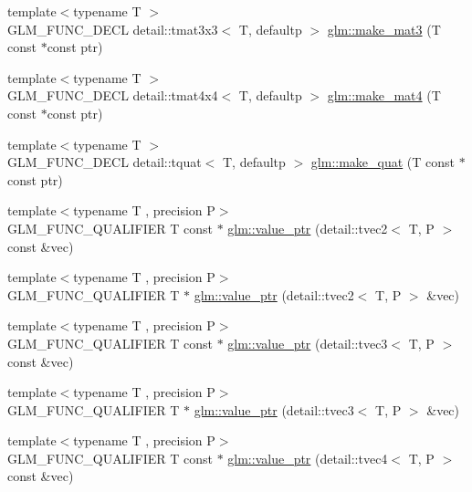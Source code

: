 \begin{DoxyCompactItemize}
\item 
{\footnotesize template$<$typename T $>$ }\\G\+L\+M\+\_\+\+F\+U\+N\+C\+\_\+\+D\+E\+CL detail\+::tmat3x3$<$ T, defaultp $>$ \hyperlink{group__gtc__type__ptr_gae50ecac46eb8771fb074e310b602bf53}{glm\+::make\+\_\+mat3} (T const $\ast$const ptr)
\item 
{\footnotesize template$<$typename T $>$ }\\G\+L\+M\+\_\+\+F\+U\+N\+C\+\_\+\+D\+E\+CL detail\+::tmat4x4$<$ T, defaultp $>$ \hyperlink{group__gtc__type__ptr_gac3920fd61f0c459a4749b8eb9107982c}{glm\+::make\+\_\+mat4} (T const $\ast$const ptr)
\item 
{\footnotesize template$<$typename T $>$ }\\G\+L\+M\+\_\+\+F\+U\+N\+C\+\_\+\+D\+E\+CL detail\+::tquat$<$ T, defaultp $>$ \hyperlink{group__gtc__type__ptr_ga051ec24a44af31a08b11eccbf8726b02}{glm\+::make\+\_\+quat} (T const $\ast$const ptr)
\item 
{\footnotesize template$<$typename T , precision P$>$ }\\G\+L\+M\+\_\+\+F\+U\+N\+C\+\_\+\+Q\+U\+A\+L\+I\+F\+I\+ER T const $\ast$ \hyperlink{group__gtc__type__ptr_gac57a976f59e794e6406ecf2924a18f4e}{glm\+::value\+\_\+ptr} (detail\+::tvec2$<$ T, P $>$ const \&vec)
\item 
{\footnotesize template$<$typename T , precision P$>$ }\\G\+L\+M\+\_\+\+F\+U\+N\+C\+\_\+\+Q\+U\+A\+L\+I\+F\+I\+ER T $\ast$ \hyperlink{group__gtc__type__ptr_gac2a64387090621acf7176b63f31b70a2}{glm\+::value\+\_\+ptr} (detail\+::tvec2$<$ T, P $>$ \&vec)
\item 
{\footnotesize template$<$typename T , precision P$>$ }\\G\+L\+M\+\_\+\+F\+U\+N\+C\+\_\+\+Q\+U\+A\+L\+I\+F\+I\+ER T const $\ast$ \hyperlink{group__gtc__type__ptr_ga676a0ba6f4b7cd817fe6d16cb3113857}{glm\+::value\+\_\+ptr} (detail\+::tvec3$<$ T, P $>$ const \&vec)
\item 
{\footnotesize template$<$typename T , precision P$>$ }\\G\+L\+M\+\_\+\+F\+U\+N\+C\+\_\+\+Q\+U\+A\+L\+I\+F\+I\+ER T $\ast$ \hyperlink{group__gtc__type__ptr_ga4babc9956e32bbd0769bc20ab2d73800}{glm\+::value\+\_\+ptr} (detail\+::tvec3$<$ T, P $>$ \&vec)
\item 
{\footnotesize template$<$typename T , precision P$>$ }\\G\+L\+M\+\_\+\+F\+U\+N\+C\+\_\+\+Q\+U\+A\+L\+I\+F\+I\+ER T const $\ast$ \hyperlink{group__gtc__type__ptr_ga6963deec2c77b8a49b3f7e434914f6ba}{glm\+::value\+\_\+ptr} (detail\+::tvec4$<$ T, P $>$ const \&vec)

\end{DoxyCompactItemize}
